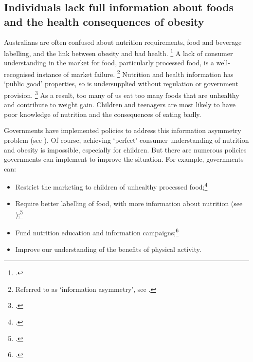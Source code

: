 \documentclass[embargoed]{grattan}
\begin{document}
\subsection{Individuals lack full information about foods and the health consequences of obesity }\label{individuals-lack-full-information-about-foods-and-the-health-consequences-of-obesity}

Australians are often confused about nutrition requirements, food and beverage labelling, and the link between obesity and bad health.%
\footcites{Baker2014Fatnationwhy}{Karnani2016ObesityCrisisas} A lack of consumer understanding in the market for food, particularly processed food, is a well-recognised instance of market failure.%
\footnote{Referred to as `information asymmetry', see \textcites{Karnani2016ObesityCrisisas}{Freebairn2010Taxationobesity}.} 
Nutrition and health information has `public good' properties, so is undersupplied without regulation or government provision.%
\footcite{Freebairn2010Taxationobesity} As a result, too many of us eat too many foods that are unhealthy and contribute to weight gain.
Children and teenagers are most likely to have poor knowledge of nutrition and the consequences of eating badly.

Governments have implemented policies to address this information asymmetry problem (see ).
Of course, achieving `perfect' consumer understanding of nutrition and obesity is impossible, especially for children.
But there are numerous policies governments can implement to improve the situation.
For example, governments can:

\begin{itemize}[topsep=-0.5ex, itemsep=-0.5ex]
\item
  Restrict the marketing to children of unhealthy processed food;\footcites{Organization2016Reportcommissionending}{Cairns2013Systematicreviewsevidence}{Magnus2009costeffectivenessremoving}{Chou2005Fastfoodrestaurant}{Boyland2011Foodcommercialsincrease}{Capacci2012Policiespromotehealthy}
\item
  Require better labelling of food, with more information about nutrition (see );\footcites{MacKay2011Legislativesolutionsunhealthy}{Freebairn2010Taxationobesity}{Capacci2012Policiespromotehealthy}{Roberto2012Factsfrontversus}{Restrepo2014Calorielabelingchain}{Magnusson2010Obesitypreventionpersonal}{Cowburn2005Consumerunderstandinguse}{Hawley2013sciencefrontpackage}{Mejean2014Associationperceptionfront}
\item
  Fund nutrition education and information campaigns;\footcites{Organization2016Reportcommissionending}{Capacci2012Policiespromotehealthy}{Hawkes2013Promotinghealthydiets}{Pettigrew2013Consumersinabilityestimate}{Liquori1998CookshopProgramoutcome}
\item
  Improve our understanding of the benefits of physical activity.
 \end{itemize}
\end{document}
